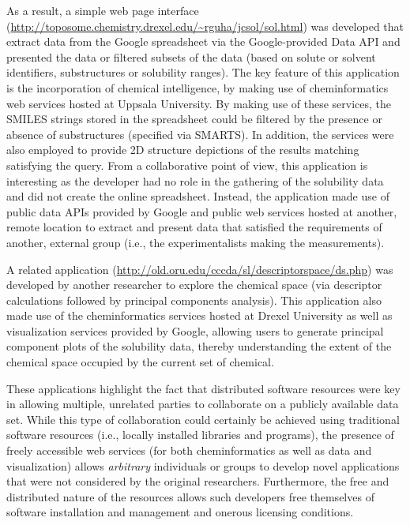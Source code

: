 \documentclass[11pt]{book}
\begin{document}
As a result, a simple web page interface
(\url{http://toposome.chemistry.drexel.edu/~rguha/jcsol/sol.html})
was developed that extract data from the Google spreadsheet via the
Google-provided Data API and presented the data or filtered subsets of
the data (based on solute or solvent identifiers, substructures or
solubility ranges). The key feature of this application is the
incorporation of chemical intelligence, by making use of
cheminformatics web services hosted at Uppsala University. By making
use of these services, the SMILES strings stored in the spreadsheet
could be filtered by the presence or absence of substructures
(specified via SMARTS). In addition, the services were also employed
to provide 2D structure depictions of the results matching satisfying
the query. From a collaborative point of view, this application is
interesting as the developer had no role in the gathering of the
solubility data and did not create the online spreadsheet. Instead,
the application made use of public data APIs provided by Google and
public web services hosted at another, remote location to extract and
present data that satisfied the requirements of another, external
group (i.e., the experimentalists making the measurements).

A related application (\url{http://old.oru.edu/cccda/sl/descriptorspace/ds.php}) 
was developed by another researcher to
explore the chemical space (via descriptor calculations followed by
principal components analysis). This application also made use of the
cheminformatics services hosted at Drexel University as well as
visualization services provided by Google, allowing users to generate
principal component plots of the solubility data, thereby
understanding the extent of the chemical space occupied by the current
set of chemical.

These applications highlight the fact that distributed software
resources were key in allowing multiple, unrelated parties to
collaborate on a publicly available data set. While this type of
collaboration could certainly be achieved using traditional software
resources (i.e., locally installed libraries and programs), the
presence of freely accessible web services (for both cheminformatics
as well as data and visualization) allows \emph{arbitrary} individuals
or groups to develop novel applications that were not considered by
the original researchers. Furthermore, the free and distributed nature
of the resources allows such developers free themselves of software
installation and management and onerous licensing conditions.
\end{document}
